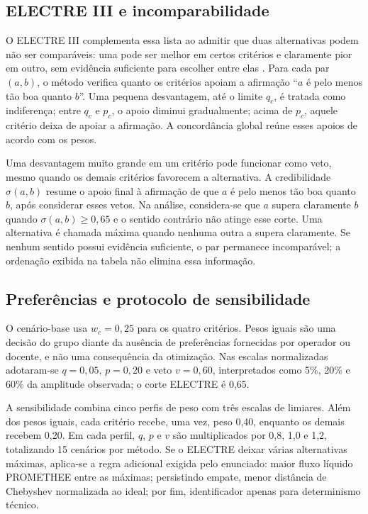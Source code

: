 \documentclass[10pt,twocolumn,a4paper]{article}
\begin{document}
\subsection{ELECTRE III e incomparabilidade}

O ELECTRE III complementa essa lista ao admitir que duas alternativas podem não ser comparáveis: uma pode ser melhor em certos critérios e claramente pior em outro, sem evidência suficiente para escolher entre elas \cite{electre_ref}. Para cada par $(a,b)$, o método verifica quanto os critérios apoiam a afirmação ``$a$ é pelo menos tão boa quanto $b$''. Uma pequena desvantagem, até o limite $q_c$, é tratada como indiferença; entre $q_c$ e $p_c$, o apoio diminui gradualmente; acima de $p_c$, aquele critério deixa de apoiar a afirmação. A concordância global reúne esses apoios de acordo com os pesos.

Uma desvantagem muito grande em um critério pode funcionar como veto, mesmo quando os demais critérios favorecem a alternativa. A credibilidade $\sigma(a,b)$ resume o apoio final à afirmação de que $a$ é pelo menos tão boa quanto $b$, após considerar esses vetos. Na análise, considera-se que $a$ supera claramente $b$ quando $\sigma(a,b)\ge0{,}65$ e o sentido contrário não atinge esse corte. Uma alternativa é chamada máxima quando nenhuma outra a supera claramente. Se nenhum sentido possui evidência suficiente, o par permanece incomparável; a ordenação exibida na tabela não elimina essa informação.

\subsection{Preferências e protocolo de sensibilidade}

O cenário-base usa $w_c=0{,}25$ para os quatro critérios. Pesos iguais são uma decisão do grupo diante da ausência de preferências fornecidas por operador ou docente, e não uma consequência da otimização. Nas escalas normalizadas adotaram-se $q=0{,}05$, $p=0{,}20$ e veto $v=0{,}60$, interpretados como 5\%, 20\% e 60\% da amplitude observada; o corte ELECTRE é 0,65.

A sensibilidade combina cinco perfis de peso com três escalas de limiares. Além dos pesos iguais, cada critério recebe, uma vez, peso 0,40, enquanto os demais recebem 0,20. Em cada perfil, $q$, $p$ e $v$ são multiplicados por 0,8, 1,0 e 1,2, totalizando 15 cenários por método. Se o ELECTRE deixar várias alternativas máximas, aplica-se a regra adicional exigida pelo enunciado: maior fluxo líquido PROMETHEE entre as máximas; persistindo empate, menor distância de Chebyshev normalizada ao ideal; por fim, identificador apenas para determinismo técnico.
\end{document}
